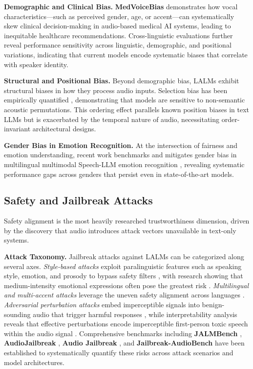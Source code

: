 \documentclass{llmxive}
\begin{document}
\textbf{Demographic and Clinical Bias.} \textbf{MedVoiceBias} \cite{tam2025medvoicebias} demonstrates how vocal characteristics---such as perceived gender, age, or accent---can systematically skew clinical decision-making in audio-based medical AI systems, leading to inequitable healthcare recommendations. Cross-linguistic evaluations \cite {wei2026bias} further reveal performance sensitivity across linguistic, demographic, and positional variations, indicating that current models encode systematic biases that correlate with speaker identity.

\textbf{Structural and Positional Bias.} Beyond demographic bias, LALMs exhibit structural biases in how they process audio inputs. Selection bias has been empirically quantified \cite{lin2025hearing}, demonstrating that models are sensitive to non-semantic acoustic permutations. This ordering effect parallels known position biases in text LLMs but is exacerbated by the temporal nature of audio, necessitating order-invariant architectural designs.

\textbf{Gender Bias in Emotion Recognition.} At the intersection of fairness and emotion understanding, recent work benchmarks and mitigates gender bias in multilingual multimodal Speech-LLM emotion recognition \cite {pang2026erm}, revealing systematic performance gaps across genders that persist even in state-of-the-art models.

\subsection{Safety and Jailbreak Attacks}
Safety alignment is the most heavily researched trustworthiness dimension, driven by the discovery that audio introduces attack vectors unavailable in text-only systems.

\textbf{Attack Taxonomy.} Jailbreak attacks against LALMs can be categorized along several axes. \textit{Style-based attacks} exploit paralinguistic features such as speaking style, emotion, and prosody to bypass safety filters \cite{li2025stylebreak}, with research showing that medium-intensity emotional expressions often pose the greatest risk \cite{feng2025investigating}. \textit{Multilingual and multi-accent attacks} leverage the uneven safety alignment across languages \cite{roh2025multilingual}. \textit{Adversarial perturbation attacks} embed imperceptible signals into benign-sounding audio that trigger harmful responses \cite{kim2025good}, while interpretability analysis reveals that effective perturbations encode imperceptible first-person toxic speech within the audio signal \cite{gupta2025bad}. Comprehensive benchmarks including \textbf{JALMBench} \cite{peng2025jalmbench}, \textbf{AudioJailbreak} \cite{chen2025audiojailbreak}, \textbf{Audio Jailbreak} \cite{song2025audio}, and \textbf{Jailbreak-AudioBench} \cite{cheng2025jailbreak} have been established to systematically quantify these risks across attack scenarios and model architectures.
\end{document}
